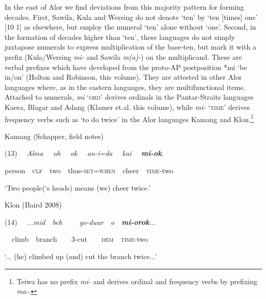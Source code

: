 In the east of Alor we find deviations from this majority pattern for forming decades. First, Sawila, Kula and Wersing do not denote {\textquoteleft}ten{\textquoteright} by {\textquoteleft}ten [times] one{\textquoteright} [10 1] as elsewhere, but employ the numeral {\textquoteleft}ten{\textquoteright} alone without {\textquoteleft}one{\textquoteright}. Second, in the formation of decades higher than {\textquoteleft}ten{\textquoteright}, these languages do not simply juxtapose numerals to express multiplication of the base-ten, but mark it with a prefix (Kula/Wersing \textit{mi-} and Sawila \textit{m(a)-}) on the multiplicand. These are verbal prefixes which have developed from the proto-AP postposition *mi {\textquoteleft}be in/on{\textquoteright} (Holton and Robinson, this volume). They are attested in other Alor languages where, as in the eastern languages, they are multifunctional items. Attached to numerals, \textit{mi }\textsc{{\textquoteleft}ord{\textquoteright} }derives ordinals in the Pantar-Straits 
languages Kaera, Blagar and Adang (Klamer et.al. this volume), while \textit{mi- }\textsc{{\textquoteleft}time{\textquoteright} }derives frequency verbs such as {\textquoteleft}to do twice{\textquoteright} in the Alor languages Kamang and Klon.\footnote{Teiwa has no prefix \textit{mi- }and derives ordinal and frequency verbs by prefixing \textit{ma-}. }  

Kamang (Schapper, field notes)

(13) \ \ \textit{Alma  \ \ uh  \ \ ok  \ \ an-i{\ng}=da{\ng}  \ \ kai  \ \ }\textbf{\textit{mi-ok}}\textit{.}

person\ \ \textsc{clf}\ \ two\ \ thus-\textsc{set=when}\ \ cheer\ \ \textsc{time}{}-two

{\textquoteleft}Two people({\textquoteleft}s heads) means (we) cheer twice.{\textquoteright}

Klon (Baird 2008)

(14) \ \ \textit{...mid\ \ beh \ \ \ \ go-duur\ \ o\ \ }\textbf{\textit{mi-orok}}\textit{...}

\ \ climb\ \ branch\ \ \ \ 3-cut\ \ \ \ \textsc{dem}\ \ \textsc{time}{}-two

{\textquoteleft}... (he) climbed up (and) cut the branch twice...{\textquoteright}

